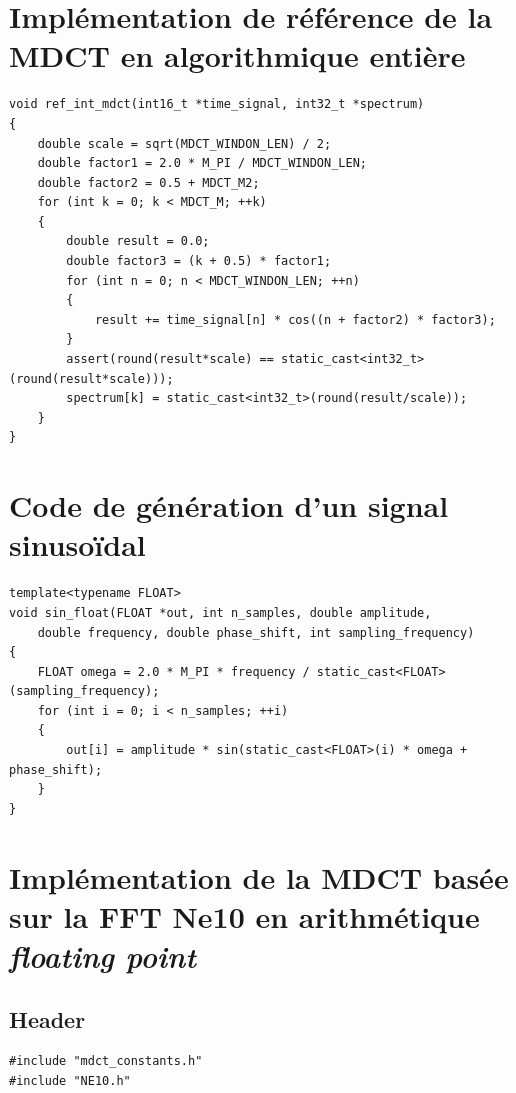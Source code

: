 \documentclass{article}
\begin{document}
\begin{appendix}
        \section{Implémentation de référence de la MDCT en algorithmique entière}
        \label{an:ref_int_mdct}
        \begin{lstlisting}
void ref_int_mdct(int16_t *time_signal, int32_t *spectrum)
{
    double scale = sqrt(MDCT_WINDON_LEN) / 2;
    double factor1 = 2.0 * M_PI / MDCT_WINDON_LEN;
    double factor2 = 0.5 + MDCT_M2;
    for (int k = 0; k < MDCT_M; ++k)
    {
        double result = 0.0;
        double factor3 = (k + 0.5) * factor1;
        for (int n = 0; n < MDCT_WINDON_LEN; ++n)
        {
            result += time_signal[n] * cos((n + factor2) * factor3);
        }
        assert(round(result*scale) == static_cast<int32_t>(round(result*scale)));
        spectrum[k] = static_cast<int32_t>(round(result/scale));
    }
}
        \end{lstlisting}



        \section{Code de génération d'un signal sinusoïdal}
        \label{an:sin_wave_int}
        \begin{lstlisting}
template<typename FLOAT>
void sin_float(FLOAT *out, int n_samples, double amplitude,
    double frequency, double phase_shift, int sampling_frequency)
{
    FLOAT omega = 2.0 * M_PI * frequency / static_cast<FLOAT>(sampling_frequency);
    for (int i = 0; i < n_samples; ++i)
    {
        out[i] = amplitude * sin(static_cast<FLOAT>(i) * omega + phase_shift);
    }
}
        \end{lstlisting}



        \section{Implémentation de la MDCT basée sur la FFT Ne10 en arithmétique \emph{floating point}}
        \label{an:mdct_ne10_f32}

        \subsection{Header}
        \label{an:mdct_ne10_f32_header}
        \begin{lstlisting}
#include "mdct_constants.h"
#include "NE10.h"


\end{lstlisting}
\end{appendix}
\end{document}
